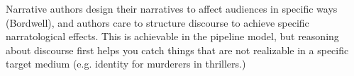 Narrative authors design their narratives to affect audiences in specific ways (Bordwell), and authors care to structure discourse to achieve specific narratological effects.  This is achievable in the pipeline model, but reasoning about discourse first helps you catch things that are not realizable in a specific target medium (e.g. identity for murderers in thrillers.)



